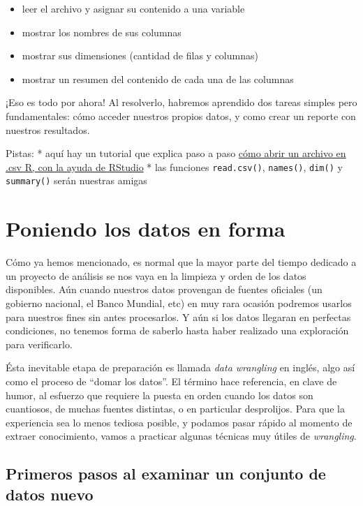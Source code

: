 \documentclass[spanish,]{book}
\providecommand{\tightlist}{%
  \setlength{\itemsep}{0pt}\setlength{\parskip}{0pt}}
\begin{document}
\begin{itemize}
\tightlist
\item
  leer el archivo y asignar su contenido a una variable
\item
  mostrar los nombres de sus columnas
\item
  mostrar sus dimensiones (cantidad de filas y columnas)
\item
  mostrar un resumen del contenido de cada una de las columnas
\end{itemize}

¡Eso es todo por ahora! Al resolverlo, habremos aprendido dos tareas simples pero fundamentales: cómo acceder nuestros propios datos, y como crear un reporte con nuestros resultados.

Pistas:
* aquí hay un tutorial que explica paso a paso \href{https://rpubs.com/HAVB/importar_datos}{cómo abrir un archivo en .csv R, con la ayuda de RStudio}
* las funciones \texttt{read.csv()}, \texttt{names()}, \texttt{dim()} y \texttt{summary()} serán nuestras amigas

\hypertarget{poniendo-los-datos-en-forma}{%
\chapter{Poniendo los datos en forma}\label{poniendo-los-datos-en-forma}}

Cómo ya hemos mencionado, es normal que la mayor parte del tiempo dedicado a un proyecto de análisis se nos vaya en la limpieza y orden de los datos disponibles. Aún cuando nuestros datos provengan de fuentes oficiales (un gobierno nacional, el Banco Mundial, etc) en muy rara ocasión podremos usarlos para nuestros fines sin antes procesarlos. Y aún si los datos llegaran en perfectas condiciones, no tenemos forma de saberlo hasta haber realizado una exploración para verificarlo.

Ésta inevitable etapa de preparación es llamada \emph{data wrangling} en inglés, algo así como el proceso de ``domar los datos''. El término hace referencia, en clave de humor, al esfuerzo que requiere la puesta en orden cuando los datos son cuantiosos, de muchas fuentes distintas, o en particular desprolijos. Para que la experiencia sea lo menos tediosa posible, y podamos pasar rápido al momento de extraer conocimiento, vamos a practicar algunas técnicas muy útiles de \emph{wrangling}.

\hypertarget{primeros-pasos-al-examinar-un-conjunto-de-datos-nuevo}{%
\section{Primeros pasos al examinar un conjunto de datos nuevo}\label{primeros-pasos-al-examinar-un-conjunto-de-datos-nuevo}}
\end{document}
